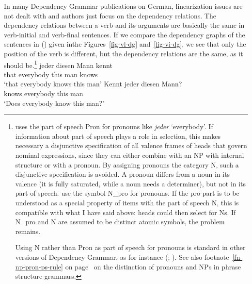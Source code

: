 \largerpage[-1]
In many Dependency Grammar publications on German, linearization issues are not dealt with and
authors just focus on the dependency relations. The dependency relations between a verb
and its arguments are basically the same in verb-initial and verb-final sentences. If we compare the
dependency graphs of the sentences in () given in\pagebreak[4] the Figures~\ref{fig-vl-dg} and~\ref{fig-vi-dg}, we see that only the position of the verb is
different, but the dependency relations are the same, as it should be.\footnote{%
  \citet{Eroms2000a} uses the part of speech Pron for pronouns like \emph{jeder}
  `everybody'. If information about part of speech plays a role in selection, this makes necessary a
  disjunctive specification of all valence frames of heads that govern nominal expressions, since
  they can either combine with an NP with internal structure or with a pronoun. By assigning
  pronouns the category N, such a disjunctive specification is avoided. A pronoun differs from a noun
  in its valence (it is fully saturated, while a noun needs a determiner), but not in its part of
  speech. \citet[]{EH2003a} use the symbol N\_pro for pronouns. If the pro-part is to be understood as
  a special property of items with the part of speech N, this is compatible with what I have said
  above: heads could then select for Ns. If N\_pro and N are assumed to be distinct atomic symbols,
  the problem remains.

  Using N rather than Pron as part of speech for pronouns is standard in other versions of
  Dependency Grammar, as for instance \wg (\citealp[]{Hudson90a-u}; \citealp[]{Hudson2007a-u}).
  See also footnote~\ref{fn-np-pron-ps-rule} on page~\pageref{fn-np-pron-ps-rule} on the distinction
  of pronouns and NPs in phrase structure grammars.%
}
\eal
\ex
\gll [dass] jeder diesen Mann kennt\\
     \spacebr{}that everybody this man knows\\
\glt `that everybody knows this man'
\ex
\gll Kennt jeder diesen Mann?\\
     knows everybody this man\\
\glt `Does everybody know this man?'
\zl

